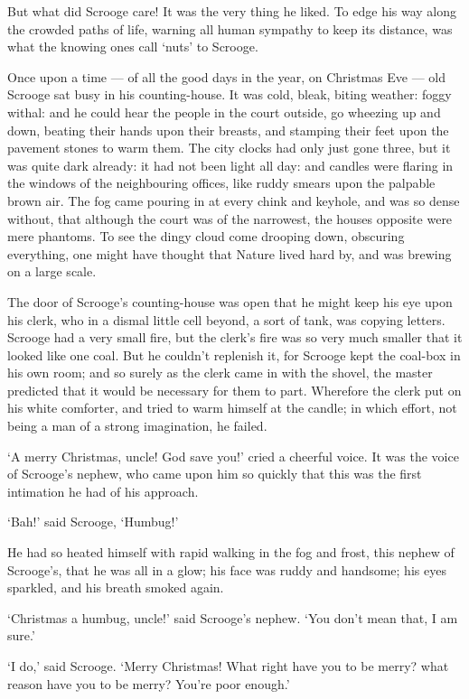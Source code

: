 \documentclass[11pt,twoside]{article}\makeatletter
\begin{document}
But what did Scrooge care!  It was the very thing he liked.  To edge his way along the crowded paths of life, warning all human sympathy to keep its distance, was what the knowing ones call ‘nuts’ to Scrooge.  \par
Once upon a time — of all the good days in the year, on Christmas Eve — old Scrooge sat busy in his counting-house. It was cold, bleak, biting weather: foggy withal: and he could hear the people in the court outside, go wheezing up and down, beating their hands upon their breasts, and stamping their feet upon the pavement stones to warm them. The city clocks had only just gone three, but it was quite dark already: it had not been light all day: and candles were flaring in the windows of the neighbouring offices, like ruddy smears upon the palpable brown air.  The fog came pouring in at every chink and keyhole, and was so dense without, that although the court was of the   narrowest, the houses opposite were mere phantoms.  To see the dingy cloud come drooping down, obscuring everything, one might have thought that Nature lived hard by, and was brewing on a large scale.  \par
The door of Scrooge's counting-house was open that he might keep his eye upon his clerk, who in a dismal little cell beyond, a sort of tank, was copying letters.  Scrooge had a very small fire, but the clerk's fire was so very much smaller that it looked like one coal.  But he couldn't replenish it, for Scrooge kept the coal-box in his own room; and so surely as the clerk came in with the shovel, the master predicted that it would be necessary for them to part.  Wherefore the clerk put on his white comforter, and tried to warm himself at the candle; in which effort, not being a man of a strong imagination, he failed.  \par
‘A merry Christmas, uncle!  God save you!’ cried a cheerful voice.  It was the voice of Scrooge's nephew, who came upon him so quickly that this was the first intimation he had of his approach. \par
‘Bah!’ said Scrooge, ‘Humbug!’\par
He had so heated himself with rapid walking in the fog and frost, this nephew of Scrooge's, that he was all in a glow; his face was ruddy and handsome; his eyes sparkled, and his breath smoked again.  \par
‘Christmas a humbug, uncle!’ said Scrooge's nephew.  ‘You don't mean that, I am sure.’\par
‘I do,’ said Scrooge.  ‘Merry Christmas!  What right have you to be merry?  what reason have you to be merry? You're poor enough.’\par
\end{document}
